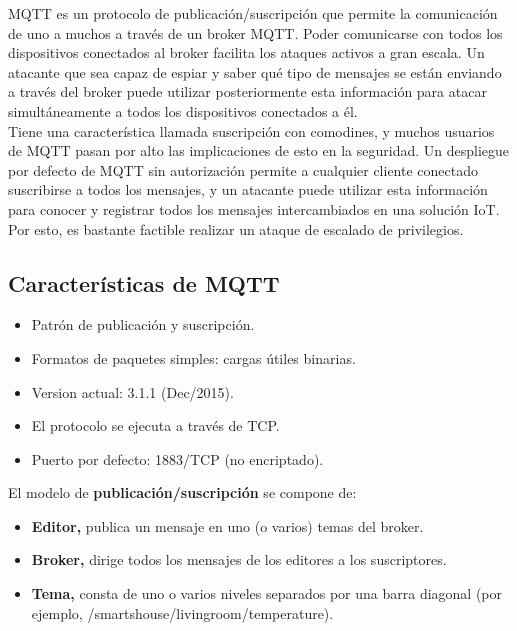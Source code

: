 {MQTT es un protocolo de publicación/suscripción que permite la comunicación de uno a muchos a través de un broker MQTT. Poder comunicarse con todos los dispositivos conectados al broker facilita los ataques activos a gran escala. Un atacante que sea capaz de espiar y saber qué tipo de mensajes se están enviando a través del broker puede utilizar posteriormente esta información para atacar simultáneamente a todos los dispositivos conectados a él. \\

Tiene una característica llamada suscripción con comodines, y muchos usuarios de MQTT pasan por alto las implicaciones de esto en la seguridad. Un despliegue por defecto de MQTT sin autorización permite a cualquier cliente conectado suscribirse a todos los mensajes, y un atacante puede utilizar esta información para conocer y registrar todos los mensajes intercambiados en una solución IoT. Por esto, es bastante factible realizar un ataque de escalado de privilegios. \cite{mqtt-security-1} \\


\subsection{Características de MQTT}

\begin{itemize}
    \item Patrón de publicación y suscripción.
    \item Formatos de paquetes simples: cargas útiles binarias.
    \item Version actual: 3.1.1 (Dec/2015).
    \item El protocolo se ejecuta a través de TCP.
    \item Puerto por defecto: 1883/TCP (no encriptado).
\end{itemize}


El modelo de \textbf{publicación/suscripción} se compone de:

\begin{itemize}
    \item \textbf{Editor,} publica un mensaje en uno (o varios) temas del broker.
    \item \textbf{Broker,} dirige todos los mensajes de los editores a los suscriptores.
    \item \textbf{Tema,} consta de uno o varios niveles separados por una barra diagonal (por ejemplo, /smartshouse/livingroom/temperature).
\end{itemize}

}
